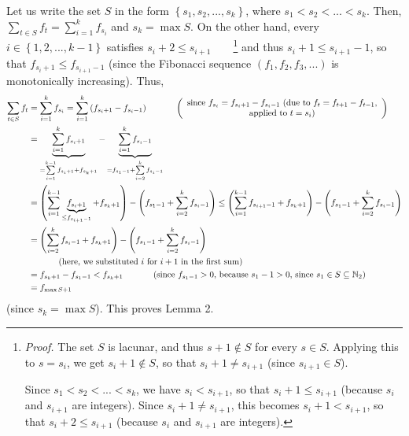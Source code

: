 \documentclass[12pt,final,notitlepage,onecolumn]{article}%
\begin{document}
Let us write the set $S$ in the form $\left\{  s_{1},s_{2},...,s_{k}\right\}
$, where $s_{1}<s_{2}<...<s_{k}$. Then, $\sum\limits_{t\in S}f_{t}%
=\sum\limits_{i=1}^{k}f_{s_{i}}$ and $s_{k}=\max S$. On the other hand, every
$i\in\left\{  1,2,...,k-1\right\}  $ satisfies $s_{i}+2\leq s_{i+1}%
$\ \ \ \ \footnote{\textit{Proof.} The set $S$ is lacunar, and thus $s+1\notin
S$ for every $s\in S$. Applying this to $s=s_{i}$, we get $s_{i}+1\notin S$,
so that $s_{i}+1\neq s_{i+1}$ (since $s_{i+1}\in S$).
\par
Since $s_{1}<s_{2}<...<s_{k}$, we have $s_{i}<s_{i+1}$, so that $s_{i}+1\leq
s_{i+1}$ (because $s_{i}$ and $s_{i+1}$ are integers). Since $s_{i}+1\neq
s_{i+1}$, this becomes $s_{i}+1<s_{i+1}$, so that $s_{i}+2\leq s_{i+1}$
(because $s_{i}$ and $s_{i+1}$ are integers).} and thus $s_{i}+1\leq
s_{i+1}-1$, so that $f_{s_{i}+1}\leq f_{s_{i+1}-1}$ (since the Fibonacci
sequence $\left(  f_{1},f_{2},f_{3},...\right)  $ is monotonically
increasing). Thus,%
\begin{align*}
\sum\limits_{t\in S}f_{t}  &  =\sum\limits_{i=1}^{k}f_{s_{i}}=\sum
\limits_{i=1}^{k}\left(  f_{s_{i}+1}-f_{s_{i}-1}\right)
\ \ \ \ \ \ \ \ \ \ \left(
\begin{array}
[c]{c}%
\text{since }f_{s_{i}}=f_{s_{i}+1}-f_{s_{i}-1}\text{ (due to }f_{t}%
=f_{t+1}-f_{t-1}\text{,}\\
\text{applied to }t=s_{i}\text{)}%
\end{array}
\right) \\
&  =\underbrace{\sum\limits_{i=1}^{k}f_{s_{i}+1}}_{=\sum\limits_{i=1}%
^{k-1}f_{s_{i}+1}+f_{s_{k}+1}}-\underbrace{\sum\limits_{i=1}^{k}f_{s_{i}-1}%
}_{=f_{s_{1}-1}+\sum\limits_{i=2}^{k}f_{s_{i}-1}}\\
&  =\left(  \sum\limits_{i=1}^{k-1}\underbrace{f_{s_{i}+1}}_{\leq
f_{s_{i+1}-1}}+f_{s_{k}+1}\right)  -\left(  f_{s_{1}-1}+\sum\limits_{i=2}%
^{k}f_{s_{i}-1}\right)  \leq\left(  \sum\limits_{i=1}^{k-1}f_{s_{i+1}%
-1}+f_{s_{k}+1}\right)  -\left(  f_{s_{1}-1}+\sum\limits_{i=2}^{k}f_{s_{i}%
-1}\right) \\
&  =\left(  \sum\limits_{i=2}^{k}f_{s_{i}-1}+f_{s_{k}+1}\right)  -\left(
f_{s_{1}-1}+\sum\limits_{i=2}^{k}f_{s_{i}-1}\right) \\
&  \ \ \ \ \ \ \ \ \ \ \left(  \text{here, we substituted }i\text{ for
}i+1\text{ in the first sum}\right) \\
&  =f_{s_{k}+1}-f_{s_{1}-1}<f_{s_{k}+1}\ \ \ \ \ \ \ \ \ \ \left(  \text{since
}f_{s_{1}-1}>0\text{, because }s_{1}-1>0\text{, since }s_{1}\in S\subseteq
\mathbb{N}_{2}\right) \\
&  =f_{\max S+1}%
\end{align*}
(since $s_{k}=\max S$). This proves Lemma 2.
\end{document}
